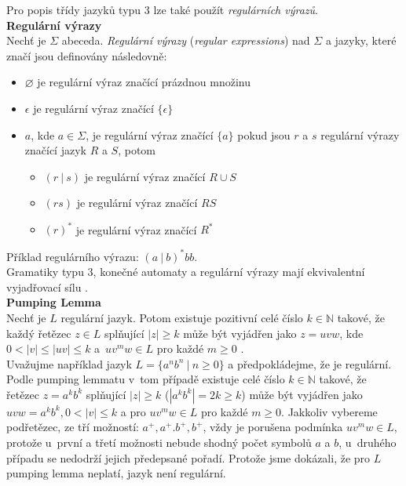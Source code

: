 Pro popis třídy jazyků typu 3 lze také použít \textit{regulárních výrazů}. \\

\textbf{Regulární výrazy} \\
Nechť je $\Sigma$ abeceda. \textit{Regulární výrazy} (\textit{regular expressions}) nad $\Sigma$ a jazyky, které značí jsou definovány následovně:
\begin{itemize}
\item $\varnothing$ je regulární výraz značící prázdnou množinu
\item $\epsilon$ je regulární výraz značící $\{\epsilon\}$
\item $a$, kde $a \in \Sigma$, je regulární výraz značící $\{a\}$
pokud jsou $r$ a $s$ regulární výrazy značící jazyk $R$ a $S$, potom 
\begin{itemize}
\item $(r \ | \ s)$ je regulární výraz značící $R \cup S$
\item $(rs)$ je regulární výraz značící $RS$
\item$(r)^*$ je regulární výraz značící $R^*$ \cite[str. 45]{Meduna2014} 
\end{itemize}
\end{itemize}
\vspace*{\baselineskip}
\Bat{} Příklad regulárního výrazu: $(a \ | \ b)^*bb$. \\

Gramatiky typu 3, konečné automaty a regulární výrazy mají ekvivalentní vyjadřovací sílu \cite[str. 47]{TIN2013}. \\

\textbf{Pumping Lemma} \\
Nechť je $L$ regulární jazyk. Potom existuje pozitivní celé číslo $k \in \mathbb{N}$ takové, že každý \mbox{řetězec} 
$z \in L$ splňující $|z| \geq k$ může být vyjádřen jako $z = uvw$, kde $0 < |v| \leq |uv| \leq k$ a~$uv^mw \in L$ pro každé 
$m \geq 0$ \cite[str. 74]{Meduna2014}. \\

\Bat{} Uvažujme například jazyk $L = \{a^nb^n \ | \ n \geq 0\}$ a předpokládejme, že je regulární. Podle pumping lemmatu v~tom případě existuje 
celé číslo $k \in \mathbb{N}$ takové, že řetězec $z = a^kb^k$ splňující $|z| \geq k$ ($|a^kb^k| = 2k \geq k$) může být vyjádřen jako 
$uvw = a^kb^k, 0 < |v| \leq k$ a pro $uv^mw \in L$ pro každé $m \geq 0$.
Jakkoliv vybereme podřetězec, ze tří možností: $a^+, a^+.b^+, b^+$,  vždy je porušena podmínka $uv^mw \in L$, protože u~první a třetí možnosti 
nebude shodný počet symbolů $a$ a $b$, u~druhého případu se nedodrží jejich předepsané pořadí.
Protože jsme dokázali, že pro $L$ pumping lemma neplatí, jazyk není regulární. \\

